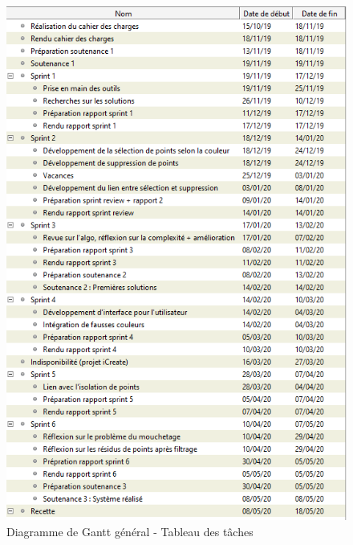 \documentclass[12pt,titlepage,french]{article}
\begin{document}
\begin{figure} [!hbtp]
 \centering
    \caption{Diagramme de Gantt général - Tableau des tâches}
    \label{Diagramme de Gantt général - Tableau des tâches}
    \includegraphics[scale=1,origin=c]{img_gantt/tableau_gantt_general.PNG}
\end{figure}
\break
\end{document}

